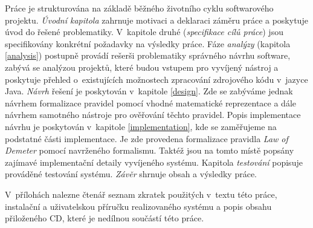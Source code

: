 Práce je strukturována na základě běžného životního cyklu softwarového projektu. \emph{Úvodní kapitola} zahrnuje motivaci a deklaraci záměru práce a poskytuje úvod do řešené problematiky. V~kapitole druhé (\emph{specifikace cílů práce}) jsou specifikovány konkrétní požadavky na výsledky práce. Fáze \emph{analýzy} (kapitola \ref{analysis}) postupně provádí rešerši problematiky správného návrhu software, zabývá se analýzou projektů, které budou vstupem pro vyvíjený nástroj a poskytuje přehled o~existujících možnostech zpracování zdrojového kódu v~jazyce Java. \emph{Návrh} řešení je poskytován v~kapitole \ref{design}. Zde se zabýváme jednak návrhem formalizace pravidel pomocí vhodné matematické reprezentace a dále návrhem samotného nástroje pro ověřování těchto pravidel. Popis implementace návrhu je poskytován v~kapitole \ref{implementation}, kde se zaměřujeme na podstatné části implementace. Je zde provedena formalizace pravidla \emph{Law of Demeter} pomocí navrženého formalismu. Taktéž jsou na tomto místě popsány zajímavé implementační detaily vyvíjeného systému. Kapitola \emph{testování} popisuje prováděné testování systému. \emph{Závěr} shrnuje obsah a výsledky práce.

V~přílohách nalezne čtenář seznam zkratek použitých v~textu této práce, instalační a uživatelskou příručku realizovaného systému a popis obsahu přiloženého CD, které je nedílnou součástí této práce.
